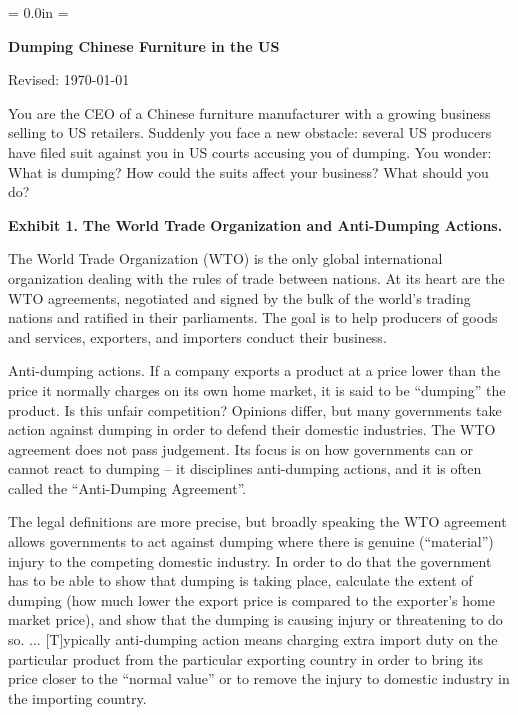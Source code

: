 \documentclass[letterpaper,12pt]{article}
\def\HeadName{Dumping Chinese Furniture in the US}
\begin{document}
\parindent = 0.0in
\parskip = \bigskipamount
\thispagestyle{empty}%
\Head

\centerline{\large \bf \HeadName}%
\centerline{Revised:  \today}

\bigskip
You are the CEO of a Chinese furniture manufacturer 
with a growing business selling to US retailers.  
Suddenly you face a new obstacle:  several US producers 
have filed suit against you in US courts accusing you of dumping.  
You wonder:  What is dumping?  
How could the suits affect your business?  
What should you do?  




\pagebreak%
{\bf Exhibit 1.} {\bf The World Trade Organization and Anti-Dumping Actions.} 

The World Trade Organization (WTO) is the only global international organization dealing with the rules of trade between nations. At its heart are the WTO agreements, negotiated and signed by the bulk of the world's trading nations and ratified in their parliaments.  The goal is to help producers of goods and services, exporters, and importers conduct their business.

Anti-dumping actions.  
If a company exports a product at a price lower than the price it normally charges on its own home market, it is said to be ``dumping'' the product. Is this unfair competition? Opinions differ, but many governments take action against dumping in order to defend their domestic industries. The WTO agreement does not pass judgement. Its focus is on how governments can or cannot react to dumping -- it disciplines anti-dumping actions, and it is often called the ``Anti-Dumping Agreement''. 

The legal definitions are more precise, but broadly speaking the WTO agreement allows governments to act against dumping where there is genuine (``material'') injury to the competing domestic industry. In order to do that the government has to be able to show that dumping is taking place, calculate the extent of dumping (how much lower the export price is compared to the exporter's home market price), and show that the dumping is causing injury or threatening to do so. ... [T]ypically anti-dumping action means charging extra import duty on the particular product from the particular exporting country in order to bring its price closer to the ``normal value'' or to remove the injury to domestic industry in the importing country.
\end{document}

